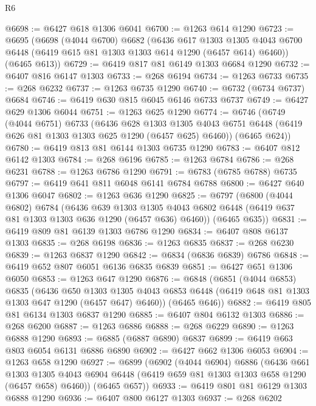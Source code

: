 \begin{lexlean}{R6}
\begin{coremodule}
@6698 := @6427 @618 @1306 @6041
@6700 := @1263 @614 @1290
@6723 := @6695
    (@6698
      (@4044 @6700)
      @6682
      (@6436
        @617
        @1303
        @1305
        @4043
        @6700
        @6448
        (@6419 @615 @81 @1303 @1303 @614 @1290 (@6457 @614) @6460))
      (@6465 @613))
@6729 := @6419 @817 @81 @6149 @1303 @6684 @1290
@6732 := @6407 @816 @6147 @1303
@6733 := @268 @6194
@6734 := @1263 @6733
@6735 := @268 @6232
@6737 := @1263 @6735 @1290
@6740 := @6732 (@6734 @6737) @6684
@6746 := @6419 @630 @815 @6045 @6146 @6733 @6737
@6749 := @6427 @629 @1306 @6044
@6751 := @1263 @625 @1290
@6774 := @6746
    (@6749
      (@4044 @6751)
      @6733
      (@6436
        @628
        @1303
        @1305
        @4043
        @6751
        @6448
        (@6419 @626 @81 @1303 @1303 @625 @1290 (@6457 @625) @6460))
      (@6465 @624))
@6780 := @6419 @813 @81 @6144 @1303 @6735 @1290
@6783 := @6407 @812 @6142 @1303
@6784 := @268 @6196
@6785 := @1263 @6784
@6786 := @268 @6231
@6788 := @1263 @6786 @1290
@6791 := @6783 (@6785 @6788) @6735
@6797 := @6419 @641 @811 @6048 @6141 @6784 @6788
@6800 := @6427 @640 @1306 @6047
@6802 := @1263 @636 @1290
@6825 := @6797
    (@6800
      (@4044 @6802)
      @6784
      (@6436
        @639
        @1303
        @1305
        @4043
        @6802
        @6448
        (@6419 @637 @81 @1303 @1303 @636 @1290 (@6457 @636) @6460))
      (@6465 @635))
@6831 := @6419 @809 @81 @6139 @1303 @6786 @1290
@6834 := @6407 @808 @6137 @1303
@6835 := @268 @6198
@6836 := @1263 @6835
@6837 := @268 @6230
@6839 := @1263 @6837 @1290
@6842 := @6834 (@6836 @6839) @6786
@6848 := @6419 @652 @807 @6051 @6136 @6835 @6839
@6851 := @6427 @651 @1306 @6050
@6853 := @1263 @647 @1290
@6876 := @6848
    (@6851
      (@4044 @6853)
      @6835
      (@6436
        @650
        @1303
        @1305
        @4043
        @6853
        @6448
        (@6419 @648 @81 @1303 @1303 @647 @1290 (@6457 @647) @6460))
      (@6465 @646))
@6882 := @6419 @805 @81 @6134 @1303 @6837 @1290
@6885 := @6407 @804 @6132 @1303
@6886 := @268 @6200
@6887 := @1263 @6886
@6888 := @268 @6229
@6890 := @1263 @6888 @1290
@6893 := @6885 (@6887 @6890) @6837
@6899 := @6419 @663 @803 @6054 @6131 @6886 @6890
@6902 := @6427 @662 @1306 @6053
@6904 := @1263 @658 @1290
@6927 := @6899
    (@6902
      (@4044 @6904)
      @6886
      (@6436
        @661
        @1303
        @1305
        @4043
        @6904
        @6448
        (@6419 @659 @81 @1303 @1303 @658 @1290 (@6457 @658) @6460))
      (@6465 @657))
@6933 := @6419 @801 @81 @6129 @1303 @6888 @1290
@6936 := @6407 @800 @6127 @1303
@6937 := @268 @6202

\end{coremodule}
\end{lexlean}
